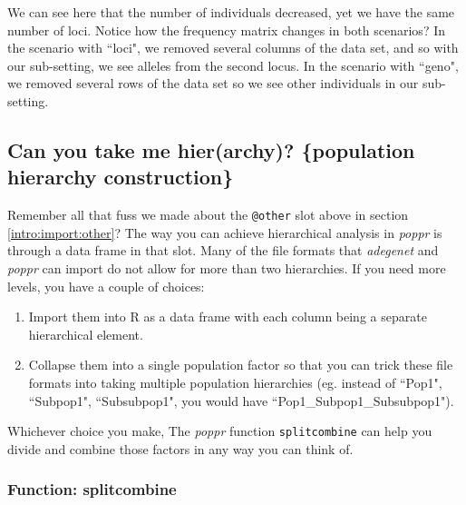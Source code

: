 \documentclass[letterpaper]{article}
\newcommand{\tab}{\hspace*{1em}}
\begin{document}
We can see here that the number of individuals decreased, yet we have the same number of loci. Notice how the frequency matrix changes in both scenarios? In the scenario with ``loci", we removed several columns of the data set, and so with our sub-setting, we see alleles from the second locus. In the scenario with ``geno", we removed several rows of the data set so we see other individuals in our sub-setting.
\subsection{Can you take me hier(archy)? \{population hierarchy construction\}}\label{data.manip:hier}

\tab\tab Remember all that fuss we made about the \texttt{@other} slot above in section \ref{intro:import:other}? The way you can achieve hierarchical analysis in \textit{poppr} is through a data frame in that slot. Many of the file formats that \textit{adegenet} and \textit{poppr} can import do not allow for more than two hierarchies. If you need more levels, you have a couple of choices: 
\begin{enumerate}
  \item Import them into R as a data frame with each column being a separate hierarchical element.
  \item Collapse them into a single population factor so that you can trick these file formats into taking multiple population hierarchies (eg. instead of ``Pop1", ``Subpop1", ``Subsubpop1", you would have ``Pop1\_Subpop1\_Subsubpop1"). 
\end{enumerate}
Whichever choice you make, The \textit{poppr} function \texttt{splitcombine} can help you divide and combine those factors in any way you can think of.
\subsubsection{Function: splitcombine}\label{data.manip:hier:splitcombine}
\end{document}
